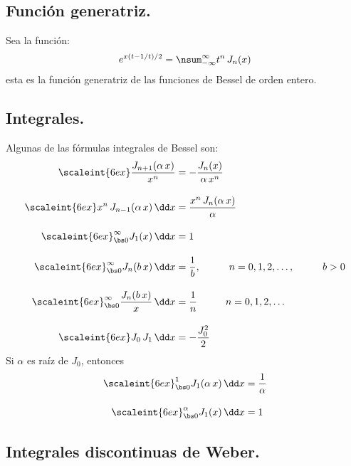 \subsection{Función generatriz.}

Sea la función:
\begin{align*}
e^{x(t-1/t)/2} = \nsum_{-\infty}^{\infty} t^{n} \, J_{n} (x)
\end{align*}
esta es la función generatriz de las funciones de Bessel de orden entero.

\subsection{Integrales.}

Algunas de las fórmulas integrales de Bessel son:
\begin{align*}
\scaleint{6ex} \dfrac{J_{n+1} (\alpha \, x)}{x^{n}} &= - \dfrac{J_{n}(x)}{\alpha \, x^{n}} \\[1em]
\scaleint{6ex} x^{n} \, J_{n-1} (\alpha \, x) \, \dd x &= \dfrac{x^{n} \, J_{n}(\alpha \, x)}{\alpha} \\[1em]
\scaleint{6ex}_{\bs 0}^{\infty} J_{1}(x) \, \dd x &= 1 \\[1em]
\scaleint{6ex}_{\bs 0}^{\infty} J_{n} (b \, x) \, \dd x &= \dfrac{1}{b}, \hspace{1cm} n = 0, 1, 2, \ldots, \hspace{1cm} b > 0 \\[1em]
\scaleint{6ex}_{\bs 0}^{\infty} \dfrac{J_{n} (b \, x)}{x} \, \dd x &= \dfrac{1}{n} \hspace{1cm} n = 0, 1, 2, \ldots \\[1em]
\scaleint{6ex} J_{0} \, J_{1} \, \dd x &= - \dfrac{J_{0}^{2}}{2}
\end{align*}
Si $\alpha$ es raíz de $J_{0}$, entonces
\begin{align*}
\scaleint{6ex}_{\bs 0}^{1} J_{1} (\alpha \, x) \, \dd x &= \dfrac{1}{\alpha} \\[1em]
\scaleint{6ex}_{\bs 0}^{\alpha} J_{1} (x) \, \dd x &= 1
\end{align*}

\subsection{Integrales discontinuas de Weber.}

